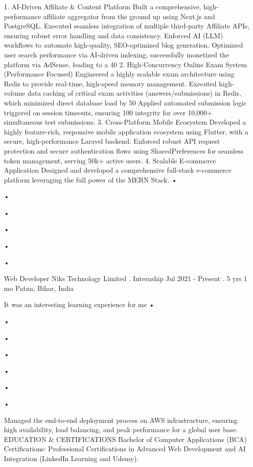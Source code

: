 1. AI-Driven Affiliate & Content Platform
Built a comprehensive, high-performance affiliate aggregator from the ground up using Next.js
and PostgreSQL.
Executed seamless integration of multiple third-party Affiliate APIs, ensuring robust error
handling and data consistency.
Enforced AI (LLM) workflows to automate high-quality, SEO-optimized blog generation.
Optimized user search performance via AI-driven indexing; successfully monetized the platform
via AdSense, leading to a 40%
2. High-Concurrency Online Exam System (Performance Focused)
Engineered a highly scalable exam architecture using Redis to provide real-time, high-speed
memory management.
Executed high-volume data caching of critical exam activities (answers/submissions) in Redis,
which minimized direct database load by 50%
Applied automated submission logic triggered on session timeouts, ensuring 100%
integrity for over 10,000+ simultaneous test submissions.
3. Cross-Platform Mobile Ecosystem
Developed a highly feature-rich, responsive mobile application ecosystem using Flutter, with a
secure, high-performance Laravel backend.
Enforced robust API request protection and secure authentication flows using
SharedPreferences for seamless token management, serving 50k+ active users.
4. Scalable E-commerce Application
Designed and developed a comprehensive full-stack e-commerce platform leveraging the full
power of the MERN Stack.
•

•

•

•

•

•

Web Developer
Niks Technology Limited . Internship
Jul 2021 - Present . 5 yrs 1 mo
Patna, Bihar, India

It was an interesting learning experience for me
•

•

•

•

•

•

•

Managed the end-to-end deployment process on AWS infrastructure, ensuring high availability,
load balancing, and peak performance for a global user base.
EDUCATION & CERTIFICATIONS
Bachelor of Computer Applications (BCA)
Certifications: Professional Certifications in Advanced Web Development and AI Integration
(LinkedIn Learning and Udemy).
